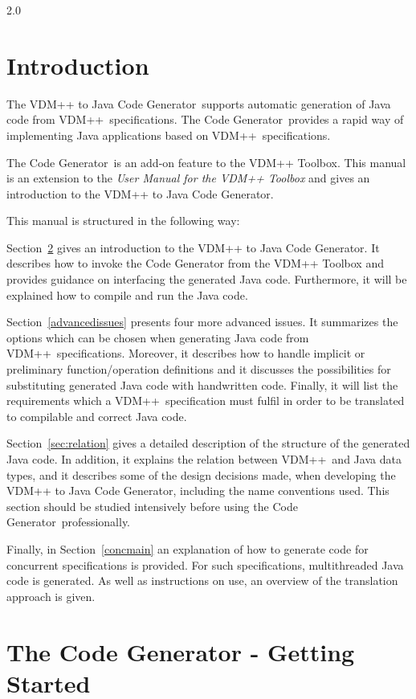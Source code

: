 \documentclass[\pformat,11pt]{article}
\newcommand{\ToolboxName}{VDM++ Toolbox}
\newcommand{\tcg}{the Code Generator}
\newcommand{\Tcg}{The Code Generator}
\newcommand{\VDM}{VDM++}
\newcommand{\cg}{VDM++ to Java Code Generator}
\begin{document}
  {2.0}

\section{Introduction}

The \cg\ supports automatic generation of Java code from \VDM\ 
specifications. \Tcg\ provides a rapid way of 
implementing Java applications based on \VDM\ specifications.

\Tcg\ is an add-on feature to the \ToolboxName{}. This manual
is an extension to the {\em User Manual for the \VDM{} Toolbox}
\cite{UserManPP-SCSK} and gives an introduction to the \cg{}. 

This manual is structured in the following way:

Section~\ref{invoking} gives an introduction to the \cg{}. It
describes how to invoke the Code Generator from the \ToolboxName{} and
provides guidance on interfacing the generated Java
code. Furthermore, it will be explained how to compile and run the
Java code. 

Section~\ref{advancedissues} presents four more advanced issues. It
summarizes the options which can be chosen when generating Java code
from \VDM\ specifications. Moreover, it describes how to handle
implicit or preliminary function/operation definitions and it
discusses the possibilities for substituting generated Java code with
handwritten code. Finally, it will list the requirements which a \VDM\
specification must fulfil in order to be translated to compilable and
correct Java code. 

Section~\ref{sec:relation} gives a detailed description of the
structure of the generated Java code. In addition, it explains the
relation between \VDM\ and Java data types, and it describes some of
the design decisions made, when developing the \cg{}, including the
name conventions used. This section should be studied intensively
before using \tcg\ professionally.

Finally, in Section~\ref{concmain} an explanation of how to generate
code for concurrent specifications is provided. For such
specifications, multithreaded Java code is generated. As well
as instructions on use, an overview of the translation approach is given. 
\newpage

\section{The Code Generator - Getting Started}\label{invoking}
\end{document}
